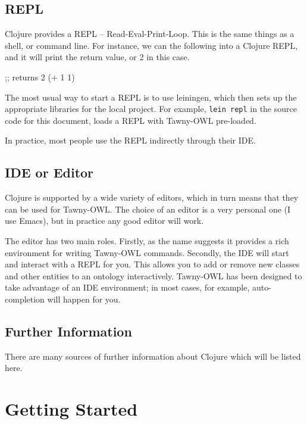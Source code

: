 \documentclass[11pt]{article}
\begin{document}
\subsection{REPL}
\label{sec-3-4}

Clojure provides a REPL -- Read-Eval-Print-Loop. This is the same things
as a shell, or command line. For instance, we can the following into a
Clojure REPL, and it will print the return value, or 2 in this case.


\begin{tawny}
;; returns 2 
(+ 1 1)
\end{tawny}

The most usual way to start a REPL is to use leiningen, which then sets
up the appropriate libraries for the local project. For example,
\texttt{lein repl} in the source code for this document, loads a REPL with
Tawny-OWL pre-loaded.

In practice, most people use the REPL indirectly through their IDE.

\subsection{IDE or Editor}
\label{sec-3-5}

Clojure is supported by a wide variety of editors, which in turn means
that they can be used for Tawny-OWL. The choice of an editor is a very
personal one (I use Emacs), but in practice any good editor will work.

The editor has two main roles. Firstly, as the name suggests it provides
a rich environment for writing Tawny-OWL commands. Secondly, the IDE
will start and interact with a REPL for you. This allows you to add or
remove new classes and other entities to an ontology interactively.
Tawny-OWL has been designed to take advantage of an IDE environment; in
most cases, for example, auto-completion will happen for you.

\subsection{Further Information}
\label{sec-3-6}

There are many sources of further information about Clojure which will
be listed here.


\section{Getting Started}
\label{sec-4}
\end{document}
